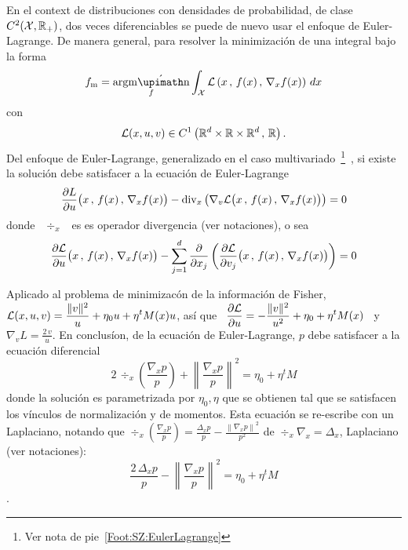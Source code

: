 En  el  context de  distribuciones  con  densidades  de probabilidad,  de  clase
$C^2(\mathcal{X},\mathbb{R}_+)$, dos veces diferenciables se puede de nuevo usar el enfoque de
Euler-Lagrange.  De  manera general,  para  resolver  la minimizaci\'on  de  una
integral bajo la forma
%
\[
f_{\mathrm{m}}  = \argmin_f  \int_\X \L\left(  x \,  , \,  f(x) \,  , \, \nabla_x
f(x) \right) \, dx
\]
%
con
%
\[
\mathcal{L}(x,u,v)  \in  C^1\left(   \mathbb{R}^d  \times  \mathbb{R}  \times  \mathbb{R}^d  \,
, \,  \mathbb{R} \right).
\]
%
Del     enfoque    de     Euler-Lagrange,     generalizado     en    el     caso
multivariado~\footnote{Ver                        nota                        de
pie~\ref{Foot:SZ:EulerLagrange}}~\cite{GelFom63, Wei74, Bru04,  Cla13, Kom1}, si
existe la soluci\'on debe satisfacer a la ecuaci\'on de Euler-Lagrange
%
\[
\frac{\partial  L}{\partial  u}\big(  x  \,  , \,  f(x)  \,  ,  \,  \nabla_x
 f(x) \big) - \operatorname{div}_x  \left( \nabla_v \mathcal{L} \big( x \, , \,  f(x) \, , \, \nabla_x
 f(x) \big) \right) = 0
\]
%
donde \ $\div_x$ \ es es operador divergencia (ver notaciones), o sea
%
\[
\frac{\partial  \mathcal{L}}{\partial  u}\big( x  \,  ,  \,  f(x)  \, ,  \,  \nabla_x
f(x)        \big)         -        \sum_{j=1}^d        \frac{\partial}{\partial
x_j}  \left(  \frac{\partial  \mathcal{L}}{\partial  v_j}  \big(  x  \,  ,  \,  f(x)  \,
,  \,  \nabla_x  f(x)  \big)  \right)   =  0
\]

Aplicado  al   problema  de  minimizac\'on   de  la  informaci\'on   de  Fisher,
$\displaystyle \mathcal{L}(x,u,v) = \frac{\| v \|^2}{u} + \eta_0 u + \eta^t M(x) u$, as\'i
que \  $\displaystyle \frac{\partial \mathcal{L}}{\partial  u} = - \frac{\|  v \|^2}{u^2}
+ \eta_0 + \eta^t M(x)$ \ y \ $ \nabla_v L = \frac{2 \, v}{u}$. En conclus\'ion,
de  la  ecuaci\'on  de  Euler-Lagrange,  $p$ debe  satisfacer  a  la  ecuaci\'on
diferencial
%
\[
2  \,  \div_x  \left(  \frac{\nabla_x p}{p}  \right)  +  \left\| \frac{ \nabla_x
p}{p} \right\|^2 = \eta_0 + \eta^t M
\]
%
donde la soluci\'on es parametrizada por  $\eta_0, \eta$ que se obtienen tal que
se satisfacen los  v\'inculos de normalizaci\'on y de  momentos. Esta ecuaci\'on
se  re-escribe con  un  Laplaciano, notando  que  $\div_x \left(  \frac{\nabla_x
p}{p} \right) = \frac{\Delta_x p}{p} - \frac{\left\| \nabla_x p \right\|^2}{p^2}
$ de $\div_x \nabla_x = \Delta_x$, Laplaciano (ver notaciones):
%
\[
\frac{2 \, \Delta_x p}{p} - \left\|  \frac{\nabla_x  p}{p}  \right\|^2 = \eta_0 + \eta^t M
\]
%
.

